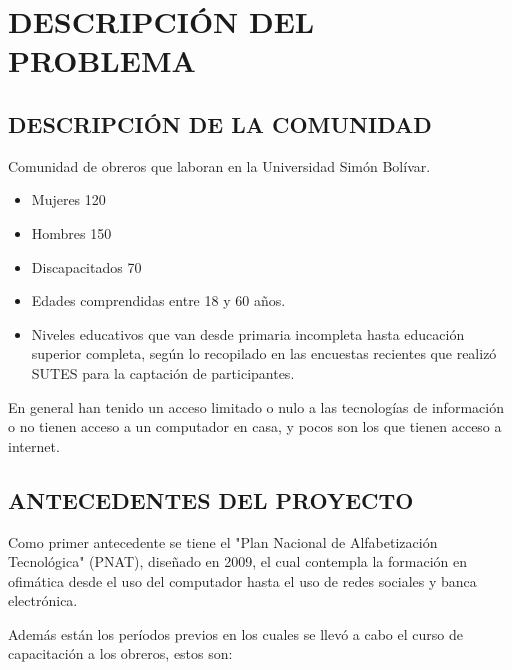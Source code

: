 	\chapter{DESCRIPCIÓN DEL PROBLEMA}
    
		\section{DESCRIPCIÓN DE LA COMUNIDAD}
			Comunidad de obreros que laboran en la Universidad Simón Bolívar. \cite{WEB}
            \begin{itemize}
                \item Mujeres 120
                \item Hombres 150
                \item Discapacitados 70
                \item Edades comprendidas entre 18 y 60 años. 
                \item Niveles educativos que van desde primaria incompleta hasta educación superior completa, según lo recopilado en las encuestas recientes que realizó SUTES para la captación de participantes.
            \end{itemize}
            
            En general han tenido un acceso limitado o nulo a las tecnologías de información o no tienen acceso a un computador en casa, y pocos son los que tienen acceso a internet.
            
		\section{ANTECEDENTES DEL PROYECTO}
            Como primer antecedente se tiene el "Plan Nacional de Alfabetización Tecnológica" (PNAT), diseñado en 2009, el cual contempla la formación en ofimática desde el  uso del computador hasta el uso de redes sociales y banca electrónica.
            
            Además están los períodos previos en los cuales se llevó a cabo el curso de capacitación a los obreros, estos son:
            
